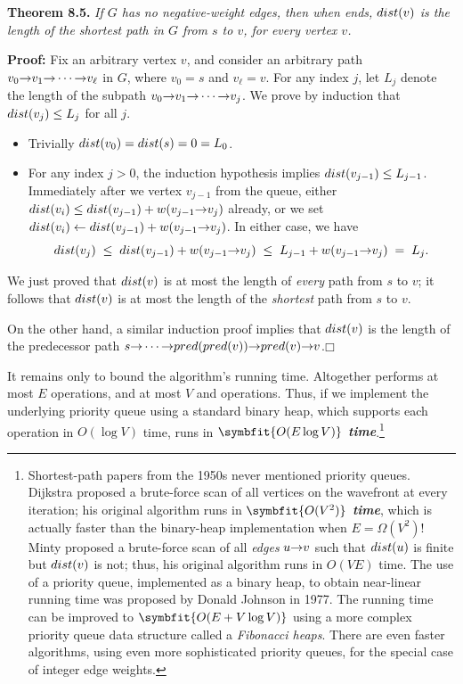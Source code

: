 \textbf{Theorem 8.5.} \textsl{If $G$ has no negative-weight edges, then when  ends, $dist(v)$ is the length of the shortest path in $G$ from $s$ to $v$, for every vertex $v$.}

\textbf{Proof:} Fix an arbitrary vertex $v$, and consider an arbitrary path $v_0\mathord{\rightarrow}v_1\mathord{\rightarrow}\cdots\mathord{\rightarrow}v_\ell$ in $G$, where $v_0 = s$ and $v_\ell = v$.
For any index $j$, let $L_j$ denote the length of the subpath $v_0\mathord{\rightarrow}v_1\mathord{\rightarrow}\cdots\mathord{\rightarrow}v_j$.
We prove by induction that $dist(v_j) \le L_j$ for all $j$.
\begin{itemize}
\item Trivially $dist(v_0) = dist(s) = 0 = L_0$.
\item For any index $j > 0$, the induction hypothesis implies $dist(v_{j-1}) \le L_{j-1}$.
Immediately after we  vertex $v_{j-1}$ from the queue, either $dist(v_i) \le dist(v_{j-1}) + w(v_{j-1}\mathord{\rightarrow}v_j)$ already, or we set $dist(v_i) \gets dist(v_{j-1}) + w(v_{j-1}\mathord{\rightarrow}v_j)$.
In either case, we have
\[
dist(v_j) \;\le\; dist(v_{j-1}) + w(v_{j-1}\mathord{\rightarrow}v_j) \;\le\; L_{j-1} + w(v_{j-1}\mathord{\rightarrow}v_j) \;=\; L_j.
\]
\end{itemize}
We just proved that $dist(v)$ is at most the length of \textit{every} path from $s$ to $v$; it follows that $dist(v)$ is at most the length of the \textit{shortest} path from $s$ to $v$.

On the other hand, a similar induction proof implies that $dist(v)$ is the length of the predecessor path $s\mathord{\rightarrow}\cdots\mathord{\rightarrow}pred(pred(v))\mathord{\rightarrow}pred(v)\mathord{\rightarrow}v$.\hfill$\mdlgwhtsquare$

It remains only to bound the algorithm’s running time.
Altogether  performs at most $E$  operations, and at most $V$  and  operations.
Thus, if we implement the underlying priority queue using a standard binary heap, which supports each operation in $O(\log V)$ time,  runs in \textbf{\textit{$\symbfit{O(E \log V)}$ time}}.\footnote{Shortest-path papers from the 1950s never mentioned priority queues. Dijkstra proposed a brute-force scan of all vertices on the wavefront at every iteration; his original algorithm runs in \textbf{\textit{$\symbfit{O(V^2)}$ time}}, which is actually faster than the binary-heap implementation when $E = \Omega(V^2)$! Minty proposed a brute-force scan of all \textit{edges} $u\mathord{\rightarrow}v$ such that $dist(u)$ is finite but $dist(v)$ is not; thus, his original algorithm runs in $O(VE)$ time. The use of a priority queue, implemented as a binary heap, to obtain near-linear running time was proposed by Donald Johnson in 1977. The running time can be improved to $\symbfit{O(E + V \log V)}$ using a more complex priority queue data structure called a \textit{Fibonacci heaps}. There are even faster algorithms, using even more sophisticated priority queues, for the special case of integer edge weights.}

